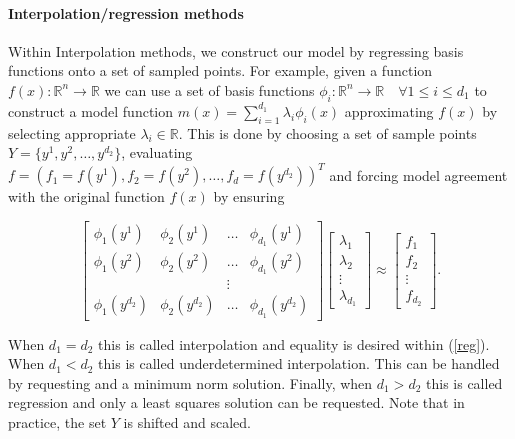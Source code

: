 \documentclass{article}
\let\oldref\ref
\renewcommand{\ref}[1]{(\oldref{#1})}
\begin{document}




\paragraph{Interpolation/regression methods}

Within Interpolation methods, we construct our model by regressing basis functions onto a set of sampled points.
For example, given a function $f(x) : \mathbb R^n \to \mathbb R$ we can use a set of basis functions $\phi_i : \mathbb R^n \to \mathbb R \quad \forall 1 \le i \le d_1$ to construct a model function $m(x) = \sum_{i=1}^{d_1} \lambda_i \phi_i(x)$ approximating $f(x)$ by selecting appropriate $\lambda_i \in \mathbb R$.
This is done by choosing a set of sample points
$Y = \{y^1, y^2, \ldots, y^{d_2}\}$,
evaluating $f = (f_1 = f(y^1), f_2 = f(y^2), \ldots, f_d = f(y^{d_2}))^T$ and forcing model agreement with the original function $f(x)$ by ensuring

\begin{equation}
\label{reg}
\begin{bmatrix}
    \phi_1(y^1)      & \phi_2(y^1)       & \ldots & \phi_{d_1}(y^1)      \\
    \phi_1(y^2)      & \phi_2(y^2)       & \dots  & \phi_{d_1}(y^2)      \\
                     &                   & \vdots &                      \\
    \phi_1(y^{d_2})  & \phi_2(y^{d_2})   & \ldots & \phi_{d_1}(y^{d_2})
\end{bmatrix}
\begin{bmatrix}
    \lambda_1      \\
    \lambda_2      \\
    \vdots         \\            
    \lambda_{d_1}
\end{bmatrix}
\approx
\begin{bmatrix}
    f_1      \\
    f_2      \\
    \vdots         \\            
    f_{d_2}
\end{bmatrix}.
\end{equation}

When $d_1 = d_2$ this is called interpolation and equality is desired within \ref{reg}.
When $d_1 < d_2$ this is called underdetermined interpolation.
This can be handled by requesting and a minimum norm solution.
Finally, when $d_1 > d_2$ this is called regression and only a least squares solution can be requested.
Note that in practice, the set $Y$ is shifted and scaled.
\end{document}
